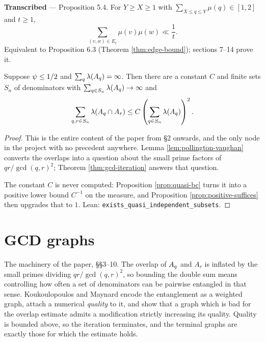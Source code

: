 \begin{theorem}
  \label{thm:second-moment}
  \notready
  \textbf{Transcribed} --- Proposition 5.4. For $Y \geq X \geq 1$ with
  $\sum_{X \leq q \leq Y}\mu(q) \in [1,2]$ and $t \geq 1$,
  \[ \sum_{(v,w) \in E_t} \mu(v)\mu(w) \ll \frac1t . \]
  Equivalent to Proposition 6.3 (Theorem \ref{thm:edge-bound}); sections 7--14 prove it.
\end{theorem}

\begin{theorem}
  \label{thm:overlap-core}
  \notready
  Suppose $\psi \leq 1/2$ and $\sum_q \lambda(A_q) = \infty$. Then there are a constant
  $C$ and finite sets $S_n$ of denominators with
  $\sum_{q \in S_n} \lambda(A_q) \to \infty$ and
  \[ \sum_{q,r \in S_n} \lambda(A_q \cap A_r) \leq C \left( \sum_{q \in S_n} \lambda(A_q) \right)^2 . \]
\end{theorem}

\begin{proof}
  This is the entire content of the paper from \S2 onwards, and the only node in the
  project with no precedent anywhere. Lemma \ref{lem:pollington-vaughan} converts the
  overlaps into a question about the small prime factors of $qr/\gcd(q,r)^2$; Theorem
  \ref{thm:gcd-iteration} answers that question.

  The constant $C$ is never computed: Proposition \ref{prop:quasi-bc} turns it into a
  positive lower bound $C^{-1}$ on the measure, and Proposition
  \ref{prop:positive-suffices} then upgrades that to $1$.
  Lean: \texttt{exists\_quasi\_independent\_subsets}.
\end{proof}

\chapter{GCD graphs}
\label{chap:gcd}

The machinery of the paper, \S\S3--10. The overlap of $A_q$ and $A_r$ is inflated by
the small primes dividing $qr/\gcd(q,r)^2$, so bounding the double sum means
controlling how often a set of denominators can be pairwise entangled in that sense.
Koukoulopoulos and Maynard encode the entanglement as a weighted graph, attach a
numerical \emph{quality} to it, and show that a graph which is bad for the overlap
estimate admits a modification strictly increasing its quality. Quality is bounded
above, so the iteration terminates, and the terminal graphs are exactly those for
which the estimate holds.

